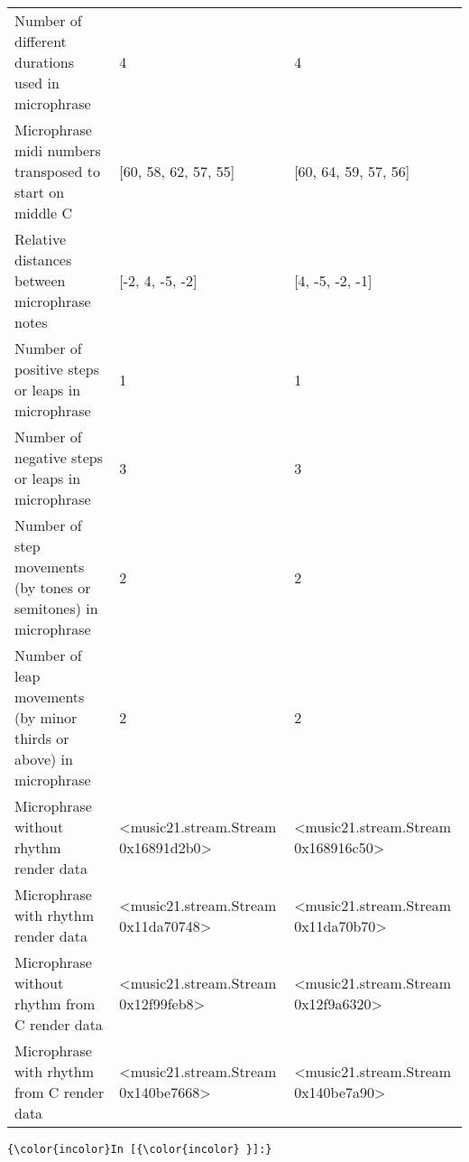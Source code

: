 \documentclass[11pt]{article}
\begin{document}
\begin{tabular}{lll}
Number of different durations used in microphrase                  &  4 &  4 \\
Microphrase midi numbers transposed to start on middle C           &  [60, 58, 62, 57, 55] &  [60, 64, 59, 57, 56] \\
Relative distances between microphrase notes                       &  [-2, 4, -5, -2] &  [4, -5, -2, -1] \\
Number of positive steps or leaps in microphrase                   &  1 &  1 \\
Number of negative steps or leaps in microphrase                   &  3 &  3 \\
Number of step movements (by tones or semitones) in microphrase    &  2 &  2 \\
Number of leap movements (by minor thirds or above) in microphrase &  2 &  2 \\
Microphrase without rhythm render data                             &  <music21.stream.Stream 0x16891d2b0> &  <music21.stream.Stream 0x168916c50> \\
Microphrase with rhythm render data                                &  <music21.stream.Stream 0x11da70748> &  <music21.stream.Stream 0x11da70b70> \\
Microphrase without rhythm from C render data                      &  <music21.stream.Stream 0x12f99feb8> &  <music21.stream.Stream 0x12f9a6320> \\
Microphrase with rhythm from C render data                         &  <music21.stream.Stream 0x140be7668> &  <music21.stream.Stream 0x140be7a90> \\
\bottomrule
\end{tabular}

    

    \begin{Verbatim}[commandchars=\\\{\}]
{\color{incolor}In [{\color{incolor} }]:} 
\end{Verbatim}


    
    
    
    
\end{document}
